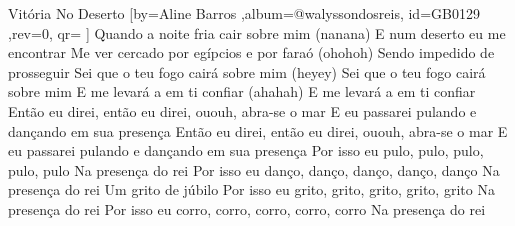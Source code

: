\beginsong
{Vitória No Deserto %
}[by={Aline Barros %
},album={@walyssondosreis},
id={GB0129 %
},rev={0}, %
qr={ %
}]
\beginverse*
Quando a noite fria cair sobre mim (nanana)
E num deserto eu me encontrar
Me ver cercado por egípcios e por faraó (ohohoh)
Sendo impedido de prosseguir
\endverse
\beginverse*
Sei que o teu fogo cairá sobre mim (heyey)
Sei que o teu fogo cairá sobre mim
E me levará a em ti confiar (ahahah)
E me levará a em ti confiar
\endverse
\beginchorus
Então eu direi, então eu direi, ououh, abra-se o mar
E eu passarei pulando e dançando em sua presença
Então eu direi, então eu direi, ououh, abra-se o mar
E eu passarei pulando e dançando em sua presença
\endchorus
\beginverse*
Por isso eu pulo, pulo, pulo, pulo, pulo
Na presença do rei
Por isso eu danço, danço, danço, danço, danço
Na presença do rei
Um grito de júbilo
Por isso eu grito, grito, grito, grito, grito
Na presença do rei
Por isso eu corro, corro, corro, corro, corro
Na presença do rei
\endverse

